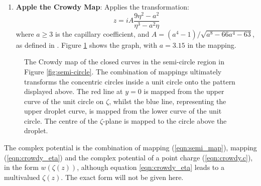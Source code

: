 \begin{enumerate}
 
   
    \item \textbf{Apple the Crowdy Map}: Applies the transformation:
    \begin{equation}\label{eqn:crowdy_eta}
        z = iA \frac{9\eta^2 - a^2}{\eta^3 - a^2 \eta}    
    \end{equation}
    where $a\geq3$ is the capillary coefficient, and $A=(a^4-1)/\sqrt{a^8-66a^4-63}$, as defined in \citet{Crowdy2015}. Figure \ref{fig:crowdy_f} shows the graph, with $a=3.15$ in the mapping.
    \end{enumerate}
        
    \begin{figure}[H]
    \centering    
    \caption{\small The Crowdy map of the closed curves in the semi-circle region in Figure \ref{fig:semi-circle}. The combination of mappings ultimately transforms the concentric circles inside a unit circle onto the pattern displayed above. The red line at $y=0$ is mapped from the upper curve of the unit circle on $\zeta$, whilst the blue line, representing the upper droplet curve, is mapped from the lower curve of the unit circle. The centre of the $\zeta$-plane is mapped to the circle above the droplet.
    } 
    \label{fig:crowdy_f}
\end{figure}

The complex potential is the combination of mapping (\ref{eqn:semi_map}), mapping (\ref{eqn:crowdy_eta}) and the complex potential of a point charge (\ref{eqn:crowdy.c}),
in the form $w(\zeta(z))$, although equation \ref{eqn:crowdy_eta} leads to a multivalued $\zeta(z)$. The exact form will not be given here.

